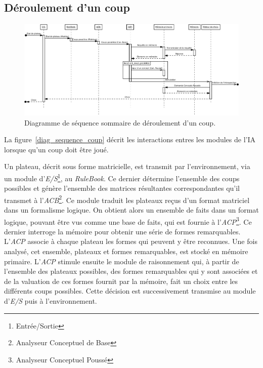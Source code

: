 \subsection{Déroulement d'un coup}
\label{deroulement_dun_coup}

\begin{figure}[p]
\centering
\includegraphics[width=0.9\textheight,angle=90]{files/analyse/sequence}
\caption{Diagramme de séquence sommaire de déroulement d'un coup.}
\label{diag_sequence_coup}
\end{figure}

La figure~\vref{diag_sequence_coup} décrit les interactions entres les modules de l'IA lorsque qu'un coup doit être joué.

Un plateau, décrit sous forme matricielle, est transmit par l'environnement, via un module d'\emph{E/S}\footnote{Entrée/Sortie}, au \emph{RuleBook}. Ce dernier détermine l'ensemble des coups possibles et génère l'ensemble des matrices résultantes correspondantes qu'il transmet à l'\emph{ACB}\footnote{Analyseur Conceptuel de Base}. Ce module traduit les plateaux reçus d'un format matriciel dans un formalisme logique. On obtient alors un ensemble de faits dans un format logique, pouvant être vus comme une base de faits, qui est fournie à l'\emph{ACP}\footnote{Analyseur Conceptuel Poussé}. Ce dernier interroge la mémoire pour obtenir une série de formes remarquables. L'\emph{ACP} associe à chaque plateau les formes qui peuvent y être reconnues. Une fois analysé, cet ensemble, plateaux et formes remarquables, est stocké en mémoire primaire. L'\emph{ACP} stimule ensuite le module de raisonnement qui, à partir de l'ensemble des plateaux possibles, des formes remarquables qui y sont associées et de la valuation de ces formes fournit par la mémoire, fait un choix entre les différents coups possibles. Cette décision est successivement transmise au module d'\emph{E/S} puis à l'environnement.
